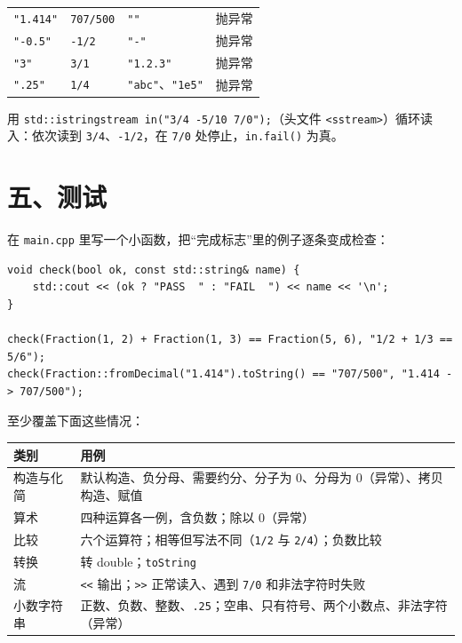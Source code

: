 \documentclass[11pt,a4paper]{article}
\newcommand{\code}[1]{\texttt{#1}}
\begin{document}
\begin{done}
\begin{tabular}{@{}ll@{\hspace{2.5em}}ll@{}}
\code{"1.414"} & \code{707/500} & \code{""} & 抛异常 \\
\code{"-0.5"} & \code{-1/2} & \code{"-"} & 抛异常 \\
\code{"3"} & \code{3/1} & \code{"1.2.3"} & 抛异常 \\
\code{".25"} & \code{1/4} & \code{"abc"}、\code{"1e5"} & 抛异常 \\
\end{tabular}

\smallskip
用 \code{std::istringstream in("3/4 -5/10 7/0");}（头文件 \code{<sstream>}）循环读入：依次读到 \code{3/4}、\code{-1/2}，在 \code{7/0} 处停止，\code{in.fail()} 为真。
\end{done}

\section{五、测试}

在 \code{main.cpp} 里写一个小函数，把“完成标志”里的例子逐条变成检查：

\begin{lstlisting}
void check(bool ok, const std::string& name) {
    std::cout << (ok ? "PASS  " : "FAIL  ") << name << '\n';
}

check(Fraction(1, 2) + Fraction(1, 3) == Fraction(5, 6), "1/2 + 1/3 == 5/6");
check(Fraction::fromDecimal("1.414").toString() == "707/500", "1.414 -> 707/500");
\end{lstlisting}

至少覆盖下面这些情况：

\begin{center}
\small
\begin{tabularx}{\linewidth}{@{}lX@{}}
\toprule
类别 & 用例 \\
\midrule
构造与化简 & 默认构造、负分母、需要约分、分子为 0、分母为 0（异常）、拷贝构造、赋值 \\
算术 & 四种运算各一例，含负数；除以 0（异常） \\
比较 & 六个运算符；相等但写法不同（\code{1/2} 与 \code{2/4}）；负数比较 \\
转换 & 转 double；\code{toString} \\
流 & \code{<<} 输出；\code{>>} 正常读入、遇到 \code{7/0} 和非法字符时失败 \\
小数字符串 & 正数、负数、整数、\code{.25}；空串、只有符号、两个小数点、非法字符（异常） \\
\bottomrule
\end{tabularx}
\end{center}
\end{document}
